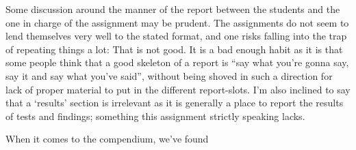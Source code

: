 Some discussion around the manner of the report between the students and the one in charge of the assignment may be prudent. The assignments do not seem to lend themselves very well to the stated format, and one risks falling into the trap of repeating things a lot: That is not good. It is a bad enough habit as it is that some people think that a good skeleton of a report is “say what you’re gonna say, say it and say what you’ve said”, without being shoved in such a direction for lack of proper material to put in the different report-slots.  I’m also inclined to say that a ‘results’ section is irrelevant as it is generally a place to report the results of tests and findings; something this assignment strictly speaking lacks.

When it comes to the compendium, we’ve found 
